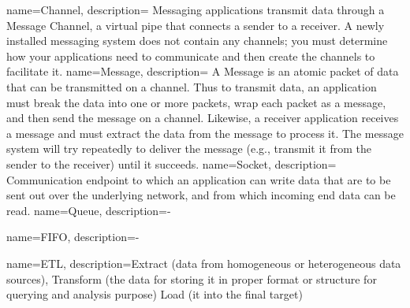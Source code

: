 {
    name=Channel,
    description={
        Messaging applications transmit data through a Message Channel, a virtual
        pipe that connects a sender to a receiver. A newly installed messaging
        system does not contain any channels; you must determine how your
        applications need to communicate and then create the channels to facilitate
        it.
    }
}
{
    name=Message,
    description={
        A Message is an atomic packet of data that can be transmitted on a
        channel. Thus to transmit data, an application must break the data into
        one or more packets, wrap each packet as a message, and then send the
        message on a channel. Likewise, a receiver application receives a
        message and must extract the data from the message to process it. The
        message system will try repeatedly to deliver the message (e.g.,
        transmit it from the sender to the receiver) until it succeeds.
    }
}
{
    name=Socket,
    description={
        Communication endpoint to which an application can write data
        that are to be sent out over the underlying network, and from which incoming end
        data can be read. \cite{TAN06}
    }
}
{
    name=Queue,
    description={-}
}


{
    name=FIFO,
    description={-}
}

{
    name=ETL,
    description={Extract (data from homogeneous or heterogeneous data sources), 
         Transform (the data for storing it in proper format or structure
         for querying and analysis purpose)
         Load (it into the final target)
    }
}

